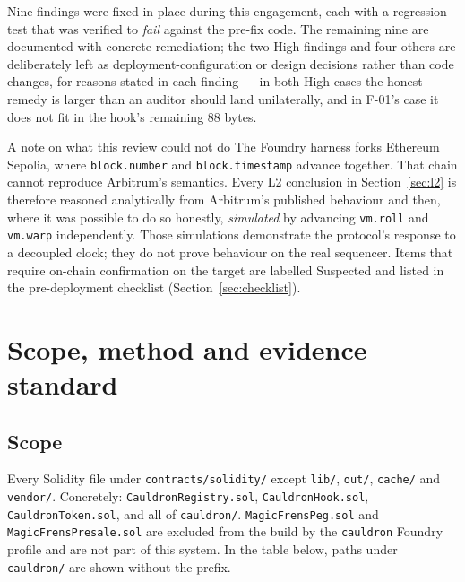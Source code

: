 \documentclass[11pt,a4paper]{article}
\newcommand{\Susp}{\textcolor{medium}{Suspected}}
\newcommand{\code}[1]{\texttt{\small #1}}
\begin{document}
Nine findings were fixed in-place during this engagement, each with a
regression test that was verified to \emph{fail} against the pre-fix code. The
remaining nine are documented with concrete remediation; the two High findings and
four others are deliberately left as deployment-configuration or design decisions
rather than code changes, for reasons stated in each finding --- in both High cases
the honest remedy is larger than an auditor should land unilaterally, and in F-01's
case it does not fit in the hook's remaining 88 bytes.

\begin{notebox}{A note on what this review could not do}
The Foundry harness forks Ethereum Sepolia, where \code{block.number} and
\code{block.timestamp} advance together. That chain cannot reproduce Arbitrum's
semantics. Every L2 conclusion in Section~\ref{sec:l2} is therefore reasoned
analytically from Arbitrum's published behaviour and then, where it was possible
to do so honestly, \emph{simulated} by advancing \code{vm.roll} and \code{vm.warp}
independently. Those simulations demonstrate the protocol's response to a
decoupled clock; they do not prove behaviour on the real sequencer. Items that
require on-chain confirmation on the target are labelled \Susp{} and listed in
the pre-deployment checklist (Section~\ref{sec:checklist}).
\end{notebox}

\newpage
\section{Scope, method and evidence standard}

\subsection{Scope}

Every Solidity file under \code{contracts/solidity/} except \code{lib/},
\code{out/}, \code{cache/} and \code{vendor/}. Concretely: \code{CauldronRegistry.sol},
\code{CauldronHook.sol}, \code{CauldronToken.sol}, and all of \code{cauldron/}.
\code{MagicFrensPeg.sol} and \code{MagicFrensPresale.sol} are excluded from the
build by the \code{cauldron} Foundry profile and are not part of this system. In the table below, paths under
\code{cauldron/} are shown without the prefix.
\end{document}
